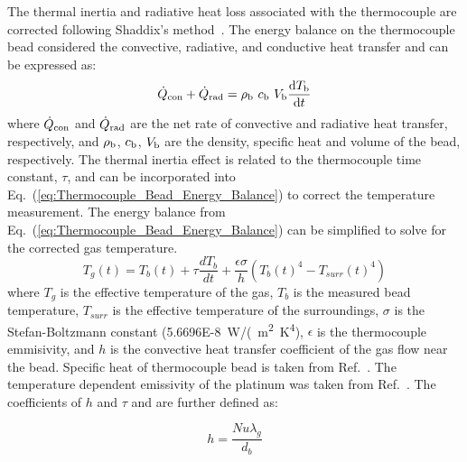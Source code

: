 \documentclass[12pt]{article}
\begin{document}
The thermal inertia and radiative heat loss associated with the thermocouple are corrected following Shaddix's method~\cite{Shaddix1999}. The energy balance on the thermocouple bead considered the convective, radiative, and conductive heat transfer and can be expressed as:
\begin{equation}\label{eq:Thermocouple_Bead_Energy_Balance}
{\dot{Q}_{\rm con}+\dot{Q}_{\rm rad}}= \rho_{\rm b}~c_{\rm b}~V_{\rm b}\frac{{\rm d}T_{\rm b}}{{\rm d}t}
\end{equation}
where $\dot{Q}_{\rm con}$ and $\dot{Q}_{\rm rad}$ are the net rate of convective and radiative heat transfer, respectively, and $\rho_{\rm b}$, $c_{\rm b}$, $V_{\rm b}$ are the density, specific heat and volume of the bead, respectively. The thermal inertia effect is related to the thermocouple time constant, $\tau$, and can be incorporated into Eq.~(\ref{eq:Thermocouple_Bead_Energy_Balance}) to correct the temperature measurement. The energy balance from Eq.~(\ref{eq:Thermocouple_Bead_Energy_Balance}) can be simplified to solve for the corrected gas temperature.
\begin{equation}\label{eq:Thermocouple_Bead_Correction}
{T_{g}(t)}= T_{b}(t)+\tau\frac{dT_{b}}{dt}+\frac{\epsilon\sigma}{h}\left({T_{b}(t)}^4-{T_{surr}(t)}^4\right)
\end{equation}
where $T_{g}$ is the effective temperature of the gas, $T_{b}$ is the measured bead temperature, $T_{surr}$ is the effective temperature of the surroundings, $\sigma$ is the Stefan-Boltzmann constant (\SI{5.6696E-8}{W/(m^2~K^4}), $\epsilon$ is the thermocouple emmisivity, and $h$ is the convective heat transfer coefficient of the gas flow near the bead. Specific heat of thermocouple bead is taken from Ref.~\cite{Jaeger1939}. The temperature dependent emissivity of the platinum was taken from Ref.~\cite{Incropera2007}. The coefficients of $h$ and $\tau$ and are further defined as:

\begin{equation}\label{eq:h_eqn}
h=\frac{Nu\lambda_{g}}{d_{b}}
\end{equation}
\end{document}

